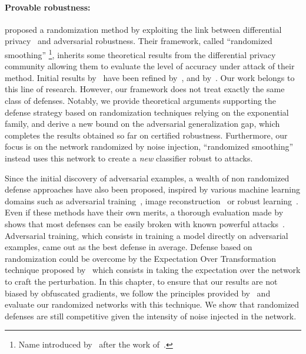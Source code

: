\paragraph{Provable robustness:}
\citet{lecuyer2018certified} proposed a randomization method by exploiting the link between differential privacy~\cite{dwork2014algorithmic} and adversarial robustness.
Their framework, called ``randomized smoothing'' \footnote{Name introduced by~\citet{cohen2019certified} after the work of~\cite{lecuyer2018certified}.}, inherits some theoretical results from the differential privacy community allowing them to evaluate the level of accuracy under attack of their method.
Initial results by~\citet{lecuyer2018certified} have been refined by~\citet{li2018second}, and by~\citet{cohen2019certified}.
Our work belongs to this line of research.
However, our framework does not treat exactly the same class of defenses.
Notably, we provide theoretical arguments supporting the defense strategy based on randomization techniques relying on the exponential family, and derive a new bound on the adversarial generalization gap, which completes the results obtained so far on certified robustness.
Furthermore, our focus is on the network randomized by noise injection, ``randomized smoothing'' instead uses this network to create a \emph{new} classifier robust to attacks.

Since the initial discovery of adversarial examples, a wealth of non randomized defense approaches have also been proposed, inspired by various machine learning domains such as adversarial training~\cite{goodfellow2014explaining,madry2018towards}, image reconstruction~\cite{meng2017magnet,samangouei2018defense} or robust learning~\cite{goodfellow2014explaining,madry2018towards}.
Even if these methods have their own merits, a thorough evaluation made by~\citet{athalye2018obfuscated} shows that most defenses can be easily broken with known powerful attacks~\cite{madry2018towards,carlini2017towards,chen2018ead}.
Adversarial training, which consists in training a model directly on adversarial examples, came out as the best defense in average.
Defense based on randomization could be overcome by the Expectation Over Transformation technique proposed by~\citet{athalye2017synthesizing} which consists in taking the expectation over the network to craft the perturbation.
In this chapter, to ensure that our results are not biased by obfuscated gradients, we follow the principles provided by~\cite{athalye2018obfuscated,carlini2019evaluating} and evaluate our randomized networks with this technique.
We show that randomized defenses are still competitive given the intensity of noise injected in the network.

